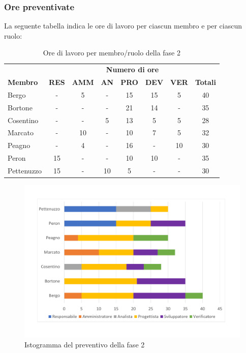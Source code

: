 	\subsubsection{Ore preventivate}
		La seguente tabella indica le ore di lavoro per ciascun membro e per ciascun ruolo:
		\begin{table}[H]
			\centering
			\begin{tabular}{| l | c c c c c c | c |}
				\rowcolor{LightBlue}
				& \multicolumn{7}{c}{\textbf{\color{white}Numero di ore}}	\\
	
				\rowcolor{LightBlue}
				\textbf{\color{white}Membro}
				& \textbf{\color{white}RES}
				& \textbf{\color{white}AMM}
				& \textbf{\color{white}AN}
				& \textbf{\color{white}PRO}
				& \textbf{\color{white}DEV}
				& \textbf{\color{white}VER}
				& \textbf{\color{white}Totali}\\

				Bergo      & - & 5 & - & 15 & 15 & 5 	& 40 \\
				Bortone    & - & - & - & 21 & 14 & - & 35 \\
				Cosentino  & - & - & 5 & 13 & 5 & 5 & 28 \\
				Marcato    & - & 10 & - & 10 & 7 & 5 & 32 \\
				Peagno     & - & 4 & - & 16 & - & 10 & 30 \\
				Peron      & 15 & - & - & 10 & 10 & - & 35 \\
				Pettenuzzo & 15 & - & 10 & 5 & - & - & 30 \\ \hline
			\end{tabular}
			\caption{Ore di lavoro per membro/ruolo della fase 2}
		\end{table}	
	\begin{figure}[H]
	\centering
	\includegraphics[scale=0.45]{images/preventivoRP.pdf}
	\caption{Istogramma del preventivo della fase 2}
\end{figure}	
		
